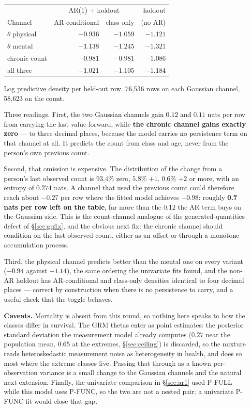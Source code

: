 \documentclass[11pt]{article}
\begin{document}
\begin{center}\small
\begin{tabular}{lrrr}
\toprule
 & \multicolumn{2}{c}{AR(1) + holdout} & holdout \\
Channel & AR-conditional & class-only & (no AR) \\
\midrule
$\theta$ physical & $-0.936$ & $-1.059$ & $-1.121$ \\
$\theta$ mental & $-1.138$ & $-1.245$ & $-1.321$ \\
chronic count & $-0.981$ & $-0.981$ & $-1.086$ \\
\midrule
all three & $-1.021$ & $-1.105$ & $-1.184$ \\
\bottomrule
\end{tabular}

{\scriptsize Log predictive density per held-out row. 76{,}536 rows on each
Gaussian channel, 58{,}623 on the count.}
\end{center}

Three readings. First, the two Gaussian channels gain $0.12$ and $0.11$ nats
per row from carrying the last value forward, while \textbf{the chronic
channel gains exactly zero} --- to three decimal places, because the model
carries no persistence term on that channel at all. It predicts the count
from class and age, never from the person's own previous count.

Second, that omission is expensive. The distribution of the change from a
person's last observed count is $93.4\%$ zero, $5.8\%$ $+1$, $0.6\%$ $+2$ or
more, with an entropy of $0.274$ nats. A channel that used the previous count
could therefore reach about $-0.27$ per row where the fitted model achieves
$-0.98$: roughly \textbf{0.7 nats per row left on the table}, far more than
the $0.12$ the AR term buys on the Gaussian side. This is the count-channel
analogue of the generated-quantities defect of \S\ref{sec:gqfix}, and the
obvious next fix: the chronic channel should condition on the last observed
count, either as an offset or through a monotone accumulation process.

Third, the physical channel predicts better than the mental one on every
variant ($-0.94$ against $-1.14$), the same ordering the univariate fits
found, and the non-AR holdout has AR-conditional and class-only densities
identical to four decimal places --- correct by construction when there is no
persistence to carry, and a useful check that the toggle behaves.

\textbf{Caveats.} Mortality is absent from this round, so nothing here speaks
to how the classes differ in survival. The GRM thetas enter as point
estimates: the posterior standard deviation the measurement model already
computes ($0.27$ near the population mean, $0.65$ at the extremes,
\S\ref{sec:ceiling}) is discarded, so the mixture reads heteroskedastic
measurement noise as heterogeneity in health, and does so most where the
extreme classes live. Passing that through as a known per-observation
variance is a small change to the Gaussian channels and the natural next
extension. Finally, the univariate comparison in \S\ref{sec:ar1} used P-FULL
while this model uses P-FUNC, so the two are not a nested pair; a univariate
P-FUNC fit would close that gap.
\end{document}
